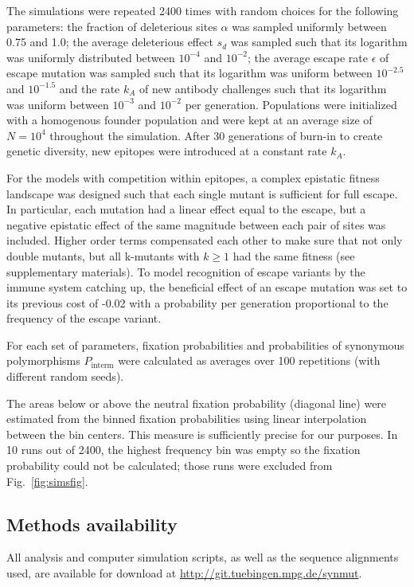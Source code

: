 \documentclass[rmp, twocolumn]{revtex4}
\newcommand{\FIG}[1]{Fig.~\ref{fig:#1}}
\begin{document}
The simulations were repeated 2400 times with random choices for the following
parameters: the fraction of deleterious sites $\alpha$ was sampled uniformly
between 0.75 and 1.0; the average deleterious effect $s_d$ was sampled such that
its logarithm was uniformly distributed  between $10^{-4}$ and $10^{-2}$; the
average escape rate $\epsilon$ of escape mutation was sampled such that its logarithm was
uniform between $10^{-2.5}$ and $10^{-1.5}$ and the rate $k_A$ of new antibody
challenges such that its logarithm was uniform between $10^{-3}$ and $10^{-2}$
per generation. Populations were initialized with a homogenous founder
population and were kept at an average size of $N=10^4$ throughout the
simulation. After 30 generations of burn-in to create genetic diversity, new
epitopes were introduced at a constant rate $k_A$. 

For the models with competition within epitopes, a complex epistatic fitness
landscape was designed such that each single mutant is sufficient for full
escape. In particular, each mutation had a linear effect equal to the escape,
but a negative epistatic effect of the same magnitude between each pair of sites
was included. Higher order terms compensated each other to make sure that not
only double mutants, but all k-mutants with $k \geq 1$ had the same fitness (see
supplementary materials). To model recognition of escape variants by the immune
system  catching up, the beneficial effect of an escape mutation was set
to its previous cost of -0.02 with a probability per generation proportional to
the frequency of the escape variant.

For each set of parameters, fixation probabilities and probabilities of
synonymous polymorphisms $P_\text{interm}$ were calculated as averages over
100 repetitions (with different random seeds).

The areas below or above the neutral fixation probability (diagonal line) were
estimated from the binned fixation probabilities using linear interpolation
between the bin centers. This measure is sufficiently precise for our purposes.
In 10 runs out of 2400, the highest frequency bin was empty so the fixation
probability could not be calculated; those runs were excluded from
\FIG{simsfig}.

\subsection{Methods availability}
All analysis and computer simulation scripts, as well as the sequence alignments
used, are available for download at \url{http://git.tuebingen.mpg.de/synmut}.
\end{document}
